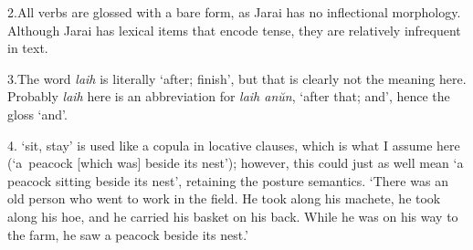 {2.\enspace All verbs are glossed with a bare form, as Jarai has
no inflectional morphology. Although Jarai has lexical items that
encode tense, they are relatively infrequent in text.

3.\enspace The word {\it laih} is literally `after; finish', but
that is clearly not the meaning here. Probably {\it laih} here is
an abbreviation for {\it laih an\u{u}n}, `after that; and', hence
the gloss `and'.

4. `sit, stay' is used like a copula in
locative clauses, which is what I assume here (`a~peacock
[which was] beside its nest'); however, this could just as well
mean `a peacock sitting beside its nest', retaining the posture
semantics.
\endpanel
\bigskip
`There was an old person who went to work in the field. He took
along his machete, he took along his hoe, and he carried his
basket on his back. While he was on his way to the farm, he saw a
peacock beside its nest.'
\xe
}
\dumpnotes


